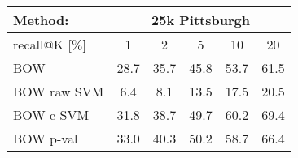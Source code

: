 
\begin{tabularx}{0.97\linewidth}{|l|c c c c c|}
  \hline 
  \rowcolor{maroon!50}
  Method: & \multicolumn{5}{c|}{25k Pittsburgh}\\
  \hline 
  \hline 
  \rowcolor{maroon!50}
  recall@K [$\%$]         & 1 & 2 & 5 & 10 & 20 \\
  \hline
  \rowcolor{maroon!10}
  BOW                     & 28.7 & 35.7 & 45.8 & 53.7 & 61.5 \\
  \rowcolor{maroon!10}
  BOW raw SVM             & 6.4  &  8.1 & 13.5 & 17.5 & 20.5 \\ 
  \rowcolor{maroon!10}
  BOW e-SVM               & 31.8 & 38.7 & 49.7 & 60.2 & 69.4 \\
  \rowcolor{maroon!10}
  BOW p-val               & 33.0 & 40.3 & 50.2 & 58.7 & 66.4 \\
  \hline
\end{tabularx}